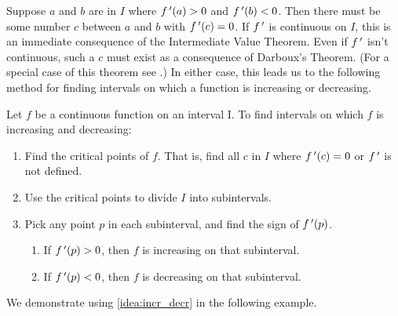 Suppose $a$ and $b$ are in $I$ where $f\,'(a)>0$ and $f\,'(b)<0$. Then there must be some number $c$ between $a$ and $b$ with $f\,'(c)=0$. If $f\,'$ is continuous on $I$, this is an immediate consequence of the Intermediate Value Theorem.  Even if $f\,'$ isn't continuous, such a $c$ must exist as a consequence of Darboux's Theorem.  (For a special case of this theorem see .)  In either case, this leads us to the following method for finding intervals on which a function is increasing or decreasing.

{
\begin{keyidea}\label{idea:incr_decr}%
Let $f$ be a continuous function on an interval I. To find intervals on which $f$ is increasing and decreasing:
\begin{enumerate}
\item	Find the critical points of $f$. That is, find all $c$ in $I$ where $f\,'(c) = 0$ or $f\,'$ is not defined.
\item	Use the critical points to divide $I$ into subintervals.
\item	Pick any point $p$ in each subinterval, and find the sign of $f\,'(p)$. 
		\begin{enumerate}
		\item	If $f\,'(p)>0$, then $f$ is increasing on that subinterval.
		\item	If $f\,'(p)<0$, then $f$ is decreasing on that subinterval.
		\end{enumerate}
\end{enumerate}
\end{keyidea}}


We demonstrate using \autoref{idea:incr_decr} in the following example.

